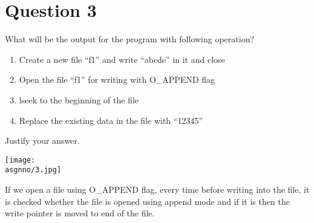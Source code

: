 \documentclass[main.tex]{subfiles}
\begin{document}
\section{Question 3}

What will be the output for the program with following operation?

\begin{enumerate}
\item Create a new file “f1” and write “abcde” in it and close
\item Open the file “f1” for writing with O\_APPEND flag 
\item lseek to the beginning of the file
\item Replace the existing data in the file with “12345”
\end{enumerate}

Justify your answer.


\centering\texttt{[image: \\asgnno/3.jpg]}

If we open a file using O\_APPEND flag, every time before writing into the file,
it is checked whether the file is opened using append mode and if it is then the
write pointer is moved to end of the file.
\end{document}
